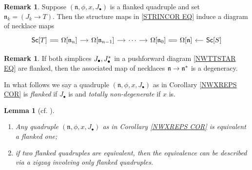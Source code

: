 \documentclass[a4paper,10pt
,draft
]{article}%
\numberwithin{equation}{section}
\numberwithin{figure}{section}
\newtheorem{lemma}[equation]{Lemma}%
\theoremstyle{definition} %
\newtheorem{remark}[equation]{Remark}%
\newcommand{\1}{\ensuremath{\mathbbm 1}}%
\begin{document}
\begin{remark}
	Suppose $(\mathfrak{n},\phi,x,J_{\bullet})$
	is a flanked quadruple
	and set $\mathfrak{n}_k = (J_k \to T)$.
	Then the structure maps in \eqref{STRINCOR EQ}
	induce a diagram of necklace maps
\begin{equation}
\begin{tikzcd}[column sep=12pt]
	\mathsf{Sc}[T]
	\ar[equal]{r} 
&
	\Omega[\mathfrak{n}_n]
	\ar{r}
&
	\Omega[\mathfrak{n}_{n-1}]
	\ar{r}
&
	\cdots
	\ar{r}
&
	\Omega[\mathfrak{n}_0]
	\ar[equal]{r}
&
	\Omega[\mathfrak{n}]
&
	\mathsf{Sc}[S]
	\ar{l}
\end{tikzcd}
\end{equation} 
\end{remark}



\begin{remark}\label{FLNKNECDEG REM}
	If both simplices 
	$J_{\bullet},J^{\**}_{\bullet}$ in a pushforward diagram
	\eqref{NWTTSTAR EQ}
	are flanked,
	then the associated map of necklaces
	$\mathfrak{n} \to \mathfrak{n}^{\**}$
	is a degeneracy.
\end{remark}


In what follows we say a quadruple
$(\mathfrak{n},\phi,x,J_{\bullet})$
as in Corollary \ref{NWXREPS COR}
is \emph{flanked} if $J_{\bullet}$ is and
\emph{totally non-degenerate} if $x$ is.


\begin{lemma}[{cf. \cite[Lemma 4.5]{DS11}}]
	\label{FLANKING LEM}
	\begin{enumerate}[label=(\roman*)]
		\item Any quadruple $(\mathfrak{n},\phi,x,J_{\bullet})$
		as in Corollary \ref{NWXREPS COR} is equivalent a flanked one;
		\item if two flanked quadruples are equivalent, then the equivalence can be described via a zigzag involving only flanked quadruples.
	\end{enumerate}
\end{lemma}
\end{document}

